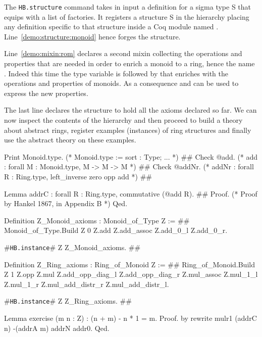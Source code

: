 \documentclass[a4paper,UKenglish,cleveref, autoref]{lipics-v2019}
\newcommand{\mixin}{mixin}
\newcommand{\factories}{factories}
\newcommand{\hbinstance}{{\tt\color{dkgreen}HB.instance}}
\newcommand{\hbstructure}{{\tt\color{dkgreen}HB.structure}}
\theoremstyle{implem}
\theoremstyle{implem}
\theoremstyle{command}
\theoremstyle{commands}
\begin{document}
The \hbstructure{} command takes in input a definition for a sigma type S
that equips  with a list of \factories{}.
It registers a structure S in the hierarchy placing
any definition specific to that structure inside a Coq module named .
Line~\ref{demo:structure:monoid} hence forges the  structure.

Line~\ref{demo:mixin:rom} declares a second \mixin{} collecting the operations
and properties that are needed in order to enrich a monoid to a ring, hence
the name . Indeed this time the type variable 
is followed by  that enriches
 with the operations and properties of monoids. As a consequence
 and  can be used to express the new properties.

The last line declares the  structure to hold all the axioms declared
so far. We can now inspect the contents of the hierarchy and then
proceed to build a theory about abstract rings,
register examples (instances) of ring structures
and finally use the abstract theory on these examples.

\begin{coqcode}
Print Monoid.type. (* Monoid.type  :=  { sort : Type;  ... }                           *) #\label{demo:theory:print:type}#
Check @add.        (* add          :   forall M : Monoid.type, M -> M -> M             *) #\label{demo:theory:check:add}#
Check @addNr.      (* addNr        :   forall R : Ring.type, left_inverse zero opp add *) #\label{demo:theory:check:addNr}#

Lemma addrC : forall R : Ring.type, commutative (@add R).                       #\label{demo:theory:state:addrC}#
Proof. (* Proof by Hankel 1867, in Appendix B *) Qed.

Definition Z_Monoid_axioms : Monoid_of_Type Z :=                         #\label{demo:theory:z:monoid:axioms}#
  Monoid_of_Type.Build Z 0 Z.add Z.add_assoc Z.add_0_l Z.add_0_r.

#\hbinstance{}# Z Z_Monoid_axioms.                                            #\label{demo:theory:z:monoid:canonical}#

Definition Z_Ring_axioms : Ring_of_Monoid Z :=                        #\label{demo:theory:z:ring:axioms}#
  Ring_of_Monoid.Build Z 1 Z.opp Z.mul
    Z.add_opp_diag_l Z.add_opp_diag_r Z.mul_assoc Z.mul_1_l Z.mul_1_r
    Z.mul_add_distr_r Z.mul_add_distr_l.

#\hbinstance{}# Z Z_Ring_axioms.                                              #\label{demo:theory:z:ring:canonical}#

Lemma exercise (m n : Z) : (n + m) - n * 1 = m.
Proof. by rewrite mulr1 (addrC n) -(addrA m) addrN addr0. Qed.
\end{coqcode}
\end{document}
